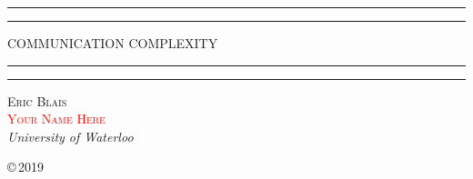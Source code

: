 \documentclass[11pt]{amsbook}
\theoremstyle{plain}
\theoremstyle{definition}
\theoremstyle{plain}
\newcommand{\replacethistext}[1]{\textcolor{red}{#1}}
\begin{document}
\begin{titlepage}
\centering
\scshape
\vspace*{\baselineskip}

\rule{\textwidth}{1.6pt}\vspace*{-\baselineskip}\vspace*{2pt}
\rule{\textwidth}{0.4pt}

\vspace{0.75\baselineskip}
    {\LARGE COMMUNICATION COMPLEXITY\\}
\vspace{0.75\baselineskip}

\rule{\textwidth}{0.4pt}\vspace*{-\baselineskip}\vspace{3.2pt}
\rule{\textwidth}{1.6pt}

\vspace{2\baselineskip}

{\scshape\Large Eric Blais \\
 \replacethistext{Your Name Here} \\}
\vspace{\baselineskip}
\textit{University of Waterloo}
	
\vfill

\copyright\,2019
\end{titlepage}


\frontmatter

\tableofcontents

\mainmatter



















\end{document}
